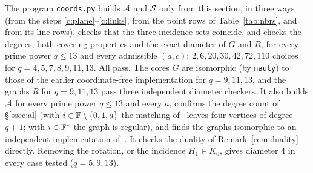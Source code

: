 \begin{remark}
The program \texttt{coords.py} builds $\mathcal{A}$ and $\mathcal{S}$ only from this section, in three ways (from the steps \ref{c:plane}--\ref{c:links}, from the point rows of Table~\ref{tab:nbrs}, and from its line rows), checks that the three incidence sets coincide, and checks the degrees, both covering properties and the exact diameter of $G$ and $R$, for every prime power $q \le 13$ and every admissible $(a,c)$: $2, 6, 20, 30, 42, 72, 110$ choices for $q = 4, 5, 7, 8, 9, 11, 13$. All pass. The cores $G$ are isomorphic (by \texttt{nauty}) to those of the earlier coordinate-free implementation for $q = 9, 11, 13$, and the graphs $R$ for $q = 9, 11, 13$ pass three independent diameter checkers. It also builds $\mathcal{A}$ for every prime power $q \le 13$ and every $a$, confirms the degree count of \S\ref{ssec:al} (with $i \in \mathbb{F} \setminus \{0,1,a\}$ the matching of~\cite{AL} leaves four vertices of degree $q+1$; with $i \in \mathbb{F}^*$ the graph is regular), and finds the graphs isomorphic to an independent implementation of~\cite{AL}. It checks the duality of Remark~\ref{rem:duality} directly. Removing the rotation, or the incidence $H_1 \in K_0$, gives diameter $4$ in every case tested ($q = 5, 9, 13$).
\end{remark}
